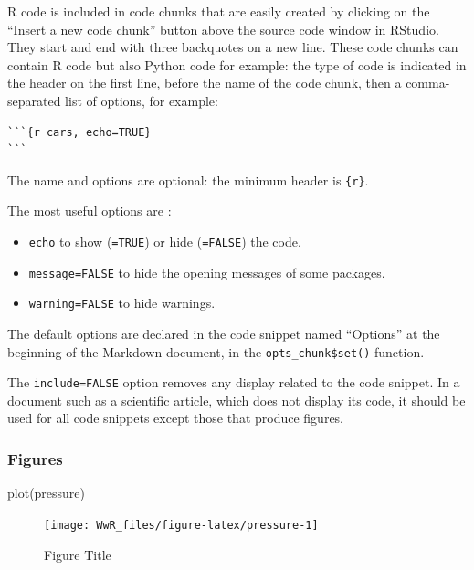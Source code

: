 \documentclass[
  12pt,
  american,
  a4paper,
  extrafontsizes,onecolumn,openright
  ]{memoir}
\newenvironment{Shaded}{\begin{snugshade}}{\end{snugshade}}
\newcommand{\FunctionTok}[1]{\textcolor[rgb]{0.00,0.00,0.00}{#1}}
\newcommand{\NormalTok}[1]{#1}
\providecommand{\tightlist}{%
  \setlength{\itemsep}{0pt}\setlength{\parskip}{0pt}}
\begin{document}
R code is included in code chunks that are easily created by clicking on the \enquote{Insert a new code chunk} button above the source code window in RStudio.
They start and end with three backquotes on a new line.
These code chunks can contain R code but also Python code for example: the type of code is indicated in the header on the first line, before the name of the code chunk, then a comma-separated list of options, for example:

\begin{verbatim}
```{r cars, echo=TRUE}
```
\end{verbatim}

The name and options are optional: the minimum header is \texttt{\{r\}}.

The most useful options are :

\begin{itemize}
\tightlist
\item
  \texttt{echo} to show (\texttt{=TRUE}) or hide (\texttt{=FALSE}) the code.
\item
  \texttt{message=FALSE} to hide the opening messages of some packages.
\item
  \texttt{warning=FALSE} to hide warnings.
\end{itemize}

The default options are declared in the code snippet named \enquote{Options} at the beginning of the Markdown document, in the \texttt{opts\_chunk\$set()} function.

The \texttt{include=FALSE} option removes any display related to the code snippet.
In a document such as a scientific article, which does not display its code, it should be used for all code snippets except those that produce figures.

\hypertarget{figures}{%
\subsubsection{Figures}\label{figures}}

\scriptsize

\begin{Shaded}
\begin{Highlighting}[]
\FunctionTok{plot}\NormalTok{(pressure)}
\end{Highlighting}
\end{Shaded}

\begin{figure}

{\centering \texttt{[image: WwR\_files/figure-latex/pressure-1]} 

}

\caption{Figure Title}\label{fig:pressure}
\end{figure}
\end{document}
